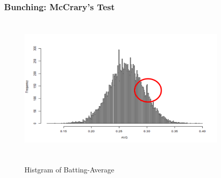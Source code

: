 \documentclass[dvipdfmx,12pt]{beamer}
\begin{document}
\begin{frame}\frametitle{Bunching: McCrary's Test}
  \begin{figure}
    \centering
    \caption{Histgram of Batting-Average}        \includegraphics[width=10cm, height=7cm, angle=0]{graphs/hist_AVG_all_withO.png}
    \label{AVG_Histgram}
  \end{figure}
\end{frame}
\end{document}
